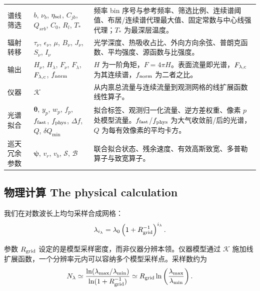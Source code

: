 \begin{longtable}{@{}p{}p{}p{}@{}}
谱线筛选 & $b$, $\nu_b$, $\eta_{\rm sel}$, $C_{jb}$, $Q_{srb}$, $C_0$, $R_l$, $T_*$ & 频率 bin 序号与参考频率、筛选比例、连续谱阈值、布居/连续谱代理最大值、固定常数与中心线强代理；$T_*$ 为最深层温度。 \\
辐射转移 & $\tau_\nu$, $\epsilon_\nu$, $\mu$, $B_\nu$, $J_\nu$, $S_\nu$, $I_\nu$ & 光学深度、热吸收占比、外向方向余弦、普朗克函数、平均强度、源函数与比强度。 \\
输出 & $H_\nu$, $H_\lambda$, $F_\nu$, $F_\lambda$, $F_{\lambda,{\rm c}}$, $f_{\rm norm}$ & $H$ 为一阶角矩，$F=4\pi H$。表面流量即光谱，$F_{\lambda,{\rm c}}$ 为其连续谱，$f_{\rm norm}$ 为二者之比。 \\
仪器 & $\mathcal{K}$ & 从内禀总流量与连续流量到观测网格的线扩展函数线性算子。 \\
光谱拟合 & $\boldsymbol{\theta}$, $y_p$, $w_p$, $f_p$, $f_{\rm fast}$, $f_{\rm phys}$, $\Delta f$, $Q$, $\delta Q_{\min}$ & 拟合标签、观测归一化流量、逆方差权重、像素 $p$ 处模型流量。$f_{\rm fast}$/$f_{\rm phys}$ 为大气收敛前/后的光谱，$Q$ 为每有效像素的平均卡方。 \\
巡天冗余参数 & $\boldsymbol{\psi}$, $v_r$, $v_b$, $\mathcal{S}$, $\mathcal{B}$ & 联合拟合状态、残余速度、有效高斯致宽、多普勒算子与致宽算子。 \\
\bottomrule
\end{longtable}
\endgroup

\subsection{物理计算 The physical calculation}

我们在对数波长上均匀采样合成网格：
\begin{equation}
\lambda_{i_\lambda} =
\lambda_0\left(1+R_{\rm grid}^{-1}\right)^{i_\lambda} .
\end{equation}

\noindent 参数 $R_{\rm grid}$ 设定的是模型采样密度，而非仪器分辨本领。仪器模型通过 $\mathcal{K}$ 施加线扩展函数，一个分辨率元内可以容纳多个模型采样点。采样数约为
\begin{equation}
N_\lambda \simeq
\frac{\ln(\lambda_{\max}/\lambda_{\min})}
     {\ln(1+R_{\rm grid}^{-1})}
\simeq R_{\rm grid}\ln\left(\frac{\lambda_{\max}}{\lambda_{\min}}\right).
\end{equation}

